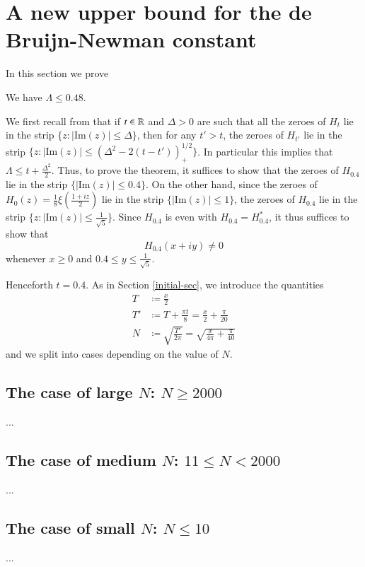 \section{A new upper bound for the de Bruijn-Newman constant}

In this section we prove

\begin{theorem}  We have $\Lambda \leq 0.48$.
\end{theorem}

We first recall from \cite[Theorem 13]{debr} that if $t \in \mathbb{R}$ and $\Delta>0$ are such that all the zeroes of $H_t$ lie in the strip $\{ z: |\mathrm{Im}(z)| \leq \Delta \}$, then for any $t' > t$, the zeroes of $H_{t'}$ lie in the strip $\{ z: |\mathrm{Im}(z)| \leq (\Delta^2 - 2(t-t'))_+^{1/2} \}$. In particular this implies that $\Lambda \leq t + \frac{\Delta^2}{2}$.  Thus, to prove the theorem, it suffices to show that the zeroes of $H_{0.4}$ lie in the strip $\{ |\mathrm{Im}(z)| \leq 0.4 \}$.  On the other hand, since the zeroes of $H_0(z) = \frac{1}{8} \xi\left(\frac{1+iz}{2}\right)$ lie in the strip $\{ |\mathrm{Im}(z)| \leq 1 \}$, the zeroes of $H_{0.4}$ lie in the strip $\{ z: |\mathrm{Im}(z)| \leq \frac{1}{\sqrt{5}}\}$.  Since $H_{0.4}$ is even with $H_{0.4} = H_{0.4}^*$, it thus suffices to show that
$$ H_{0.4}(x+iy) \neq 0$$
whenever $x \geq 0$ and $0.4 \leq y \leq \frac{1}{\sqrt{5}}$.

Henceforth $t=0.4$.  As in Section \ref{initial-sec}, we introduce the quantities
\begin{align*}
T &\coloneqq \frac{x}{2}\\
T' &\coloneqq T + \frac{\pi t}{8} = \frac{x}{2} + \frac{\pi}{20} \\
N &\coloneqq \sqrt{\frac{T'}{2\pi}} = \sqrt{\frac{x}{4\pi} + \frac{\pi}{40}}
\end{align*}
and we split into cases depending on the value of $N$.

\subsection{The case of large $N$: $N \geq 2000$}

...

\subsection{The case of medium $N$: $11 \leq N < 2000$}

...

\subsection{The case of small $N$: $N \leq 10$}

...


